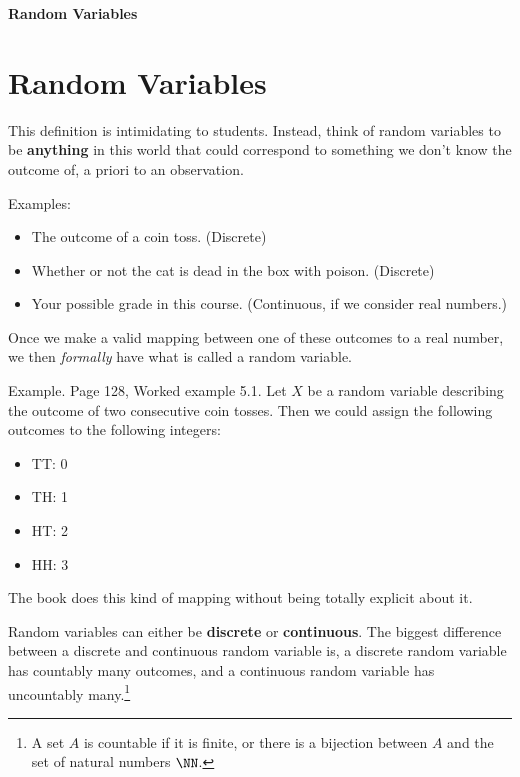 \documentclass[10pt, leqno]{exam}
\newcommand{\assignment}{Random Variables}
\begin{document}
    \textbf{{\LARGE \assignment}}

    \section{Random Variables}

    This definition is intimidating to students. Instead, think of random
    variables to be \textbf{anything} in this world that could correspond
    to something we don't know the outcome of, a priori to an observation.

    \medskip

    Examples:
    \begin{itemize}
    \item The outcome of a coin toss. (Discrete)
    \item Whether or not the cat is dead in the box with poison. (Discrete)
    \item Your possible grade in this course. (Continuous, if we consider real numbers.)
    \end{itemize}
    Once we make a valid mapping between one of these outcomes to a real number,
    we then \textit{formally} have what is called a random variable.

    \medskip

    Example. Page 128, Worked example 5.1. Let $X$ be a random variable describing
    the outcome of two consecutive coin tosses. Then we could assign the
    following outcomes to the following integers:
    \begin{itemize}
    \item TT: 0
    \item TH: 1
    \item HT: 2
    \item HH: 3
    \end{itemize}
    The book does this kind of mapping without being totally explicit about it.

    \medskip

    Random variables can either be \textbf{discrete} or \textbf{continuous}.
    The biggest difference between a discrete and continuous random variable
    is, a discrete random variable has countably many outcomes, and
    a continuous random variable has uncountably many.\footnote{A set
    $A$ is countable if it is finite, or there is a bijection between
    $A$ and the set of natural numbers $\NN$.}
\end{document}
